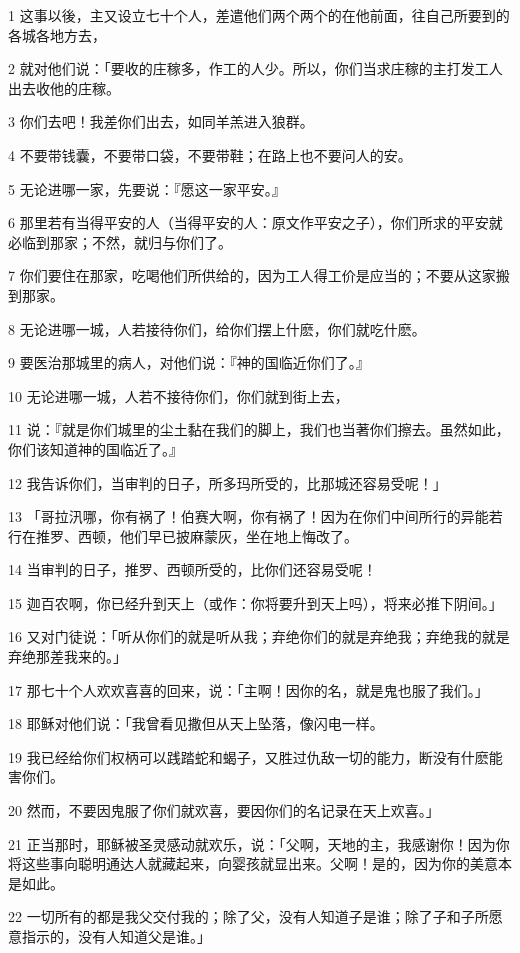 \par 1 这事以後，主又设立七十个人，差遣他们两个两个的在他前面，往自己所要到的各城各地方去，
\par 2 就对他们说：「要收的庄稼多，作工的人少。所以，你们当求庄稼的主打发工人出去收他的庄稼。
\par 3 你们去吧！我差你们出去，如同羊羔进入狼群。
\par 4 不要带钱囊，不要带口袋，不要带鞋；在路上也不要问人的安。
\par 5 无论进哪一家，先要说：『愿这一家平安。』
\par 6 那里若有当得平安的人（当得平安的人：原文作平安之子），你们所求的平安就必临到那家；不然，就归与你们了。
\par 7 你们要住在那家，吃喝他们所供给的，因为工人得工价是应当的；不要从这家搬到那家。
\par 8 无论进哪一城，人若接待你们，给你们摆上什麽，你们就吃什麽。
\par 9 要医治那城里的病人，对他们说：『神的国临近你们了。』
\par 10 无论进哪一城，人若不接待你们，你们就到街上去，
\par 11 说：『就是你们城里的尘土黏在我们的脚上，我们也当著你们擦去。虽然如此，你们该知道神的国临近了。』
\par 12 我告诉你们，当审判的日子，所多玛所受的，比那城还容易受呢！」
\par 13 「哥拉汛哪，你有祸了！伯赛大啊，你有祸了！因为在你们中间所行的异能若行在推罗、西顿，他们早已披麻蒙灰，坐在地上悔改了。
\par 14 当审判的日子，推罗、西顿所受的，比你们还容易受呢！
\par 15 迦百农啊，你已经升到天上（或作：你将要升到天上吗），将来必推下阴间。」
\par 16 又对门徒说：「听从你们的就是听从我；弃绝你们的就是弃绝我；弃绝我的就是弃绝那差我来的。」
\par 17 那七十个人欢欢喜喜的回来，说：「主啊！因你的名，就是鬼也服了我们。」
\par 18 耶稣对他们说：「我曾看见撒但从天上坠落，像闪电一样。
\par 19 我已经给你们权柄可以践踏蛇和蝎子，又胜过仇敌一切的能力，断没有什麽能害你们。
\par 20 然而，不要因鬼服了你们就欢喜，要因你们的名记录在天上欢喜。」
\par 21 正当那时，耶稣被圣灵感动就欢乐，说：「父啊，天地的主，我感谢你！因为你将这些事向聪明通达人就藏起来，向婴孩就显出来。父啊！是的，因为你的美意本是如此。
\par 22 一切所有的都是我父交付我的；除了父，没有人知道子是谁；除了子和子所愿意指示的，没有人知道父是谁。」
